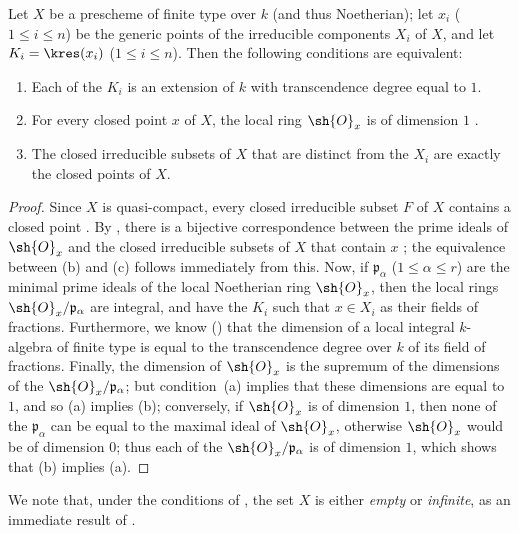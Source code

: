 \begin{proposition}[7.4.1]
\label{II.7.4.1}
Let $X$ be a prescheme of finite type over $k$ (and thus Noetherian);
let $x_i$ ($1\leq i\leq n$) be the generic points of the irreducible components $X_i$ of $X$, and let $K_i=\kres(x_i)$ ($1\leq i\leq n$).
Then the following conditions are equivalent:
\begin{enumerate}
    \item[\rm{(a)}] Each of the $K_i$ is an extension of $k$ with transcendence degree equal to $1$.
    \item[\rm{(b)}] For every closed point $x$ of $X$, the local ring $\sh{O}_x$ is of dimension $1$ .
    \item[\rm{(c)}] The closed irreducible subsets of $X$ that are distinct from the $X_i$ are exactly the closed points of $X$.
\end{enumerate}
\end{proposition}

\begin{proof}
Since $X$ is quasi-compact, every closed irreducible subset $F$ of $X$ contains a closed point .
By , there is a bijective correspondence between the prime ideals of $\sh{O}_x$ and the closed irreducible subsets of $X$ that contain $x$ ;
the equivalence between (b) and (c) follows immediately from this.
Now, if $\mathfrak{p}_\alpha$ ($1\leq\alpha\leq r$) are the minimal prime ideals of the local Noetherian ring $\sh{O}_x$, then the local rings $\sh{O}_x/\mathfrak{p}_\alpha$ are integral, and have the $K_i$ such that $x\in X_i$ as their fields of fractions.
Furthermore, we know (\cite[p.~4-06, th.~2]{I-1}) that the dimension of a local integral $k$-algebra of finite type is equal to the transcendence degree over $k$ of its field of fractions.
Finally, the dimension of $\sh{O}_x$ is the supremum of the dimensions of the $\sh{O}_x/\mathfrak{p}_\alpha$;
but condition~(a) implies that these dimensions are equal to $1$, and so (a) implies (b);
conversely, if $\sh{O}_x$ is of dimension $1$, then none of the $\mathfrak{p}_\alpha$ can be equal to the maximal ideal of $\sh{O}_x$, otherwise $\sh{O}_x$ would be of dimension $0$;
thus each of the $\sh{O}_x/\mathfrak{p}_\alpha$ is of dimension $1$, which shows that (b) implies (a).
\end{proof}

We note that, under the conditions of , the set $X$ is either \emph{empty} or \emph{infinite}, as an immediate result of .

